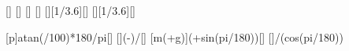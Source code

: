 [\mpss]
[\kg]
[\percent]
[\s]
[\kmph][1/3.6][\mps]
[\kmph][1/3.6][\mps]

[\arctan p]{atan(\stgX/100)*180/pi}[\degree]
[]{(\vEnX-\vAnX)/\tMoX}[\mpss]
[m\left(+g\sin\alpha\right)]{\mMoX*(\aMoX+\gEX*sin(\wiX*pi/180))}[\newton]
[]{\FAnX/(\mMoX*\gEX*cos(\wiX*pi/180))}
